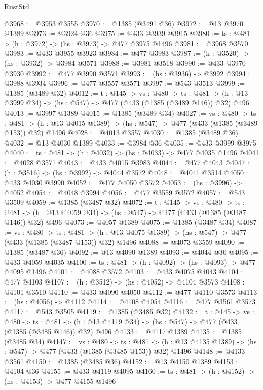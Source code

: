 \begin{lexlean}{RustStd}
\begin{coremodule}
{\begin{coremodule}
{{{{{{{@3968 := @3953 @3555
@3970 := @1385 (@3491 @36)
@3972 := @13 @3970 @1389
@3973 := @3924 @36
@3975 := @433 @3939 @3915
@3980 := {ts : @481} -> (h : @3972) -> (hs : @3973) -> @477 @3975 @1496
@3981 := @3968 @3570
@3983 := @433 @3955 @3923
@3984 := @477 @3983
@3987 := (h : @3520) -> (hs : @3932) -> @3984 @3571
@3988 := @3981 @3518
@3990 := @433 @3970 @3930
@3992 := @477 @3990 @3571
@3993 := (hs : @3936) -> @3992
@3994 := @3988 @3934
@3996 := @477 @3557 @3571
@3997 := @543 @3513
@3999 := @1385 (@3489 @32)
@4012 := {t : @145} ->
  {vs : @480} ->
  {ts : @481} -> (h : @13 @3999 @34) -> (hs : @547) -> @477 (@433 (@1385 (@3489 @146)) @32) @496
@4013 := @3997 @1389
@4015 := @1385 (@3489 @34)
@4027 := {vs : @480} ->
  {ts : @481} -> (h : @13 @4015 @1389) -> (hs : @547) -> @477 (@433 (@1385 (@3489 @153)) @32) @1496
@4028 := @4013 @3557
@4030 := @1385 (@3489 @36)
@4032 := @13 @4030 @1389
@4033 := @3984 @36
@4035 := @433 @3999 @3975
@4040 := {ts : @481} -> (h : @4032) -> (hs : @4033) -> @477 @4035 @1496
@4041 := @4028 @3571
@4043 := @433 @4015 @3983
@4044 := @477 @4043
@4047 := (h : @3516) -> (hs : @3992) -> @4044 @3572
@4048 := @4041 @3514
@4050 := @433 @4030 @3990
@4052 := @477 @4050 @3572
@4053 := (hs : @3996) -> @4052
@4054 := @4048 @3994
@4056 := @477 @3559 @3572
@4057 := @543 @3509
@4059 := @1385 (@3487 @32)
@4072 := {t : @145} ->
  {vs : @480} ->
  {ts : @481} -> (h : @13 @4059 @34) -> (hs : @547) -> @477 (@433 (@1385 (@3487 @146)) @32) @496
@4073 := @4057 @1389
@4075 := @1385 (@3487 @34)
@4087 := {vs : @480} ->
  {ts : @481} -> (h : @13 @4075 @1389) -> (hs : @547) -> @477 (@433 (@1385 (@3487 @153)) @32) @1496
@4088 := @4073 @3559
@4090 := @1385 (@3487 @36)
@4092 := @13 @4090 @1389
@4093 := @4044 @36
@4095 := @433 @4059 @4035
@4100 := {ts : @481} -> (h : @4092) -> (hs : @4093) -> @477 @4095 @1496
@4101 := @4088 @3572
@4103 := @433 @4075 @4043
@4104 := @477 @4103
@4107 := (h : @3512) -> (hs : @4052) -> @4104 @3573
@4108 := @4101 @3510
@4110 := @433 @4090 @4050
@4112 := @477 @4110 @3573
@4113 := (hs : @4056) -> @4112
@4114 := @4108 @4054
@4116 := @477 @3561 @3573
@4117 := @543 @3505
@4119 := @1385 (@3485 @32)
@4132 := {t : @145} ->
  {vs : @480} ->
  {ts : @481} -> (h : @13 @4119 @34) -> (hs : @547) -> @477 (@433 (@1385 (@3485 @146)) @32) @496
@4133 := @4117 @1389
@4135 := @1385 (@3485 @34)
@4147 := {vs : @480} ->
  {ts : @481} -> (h : @13 @4135 @1389) -> (hs : @547) -> @477 (@433 (@1385 (@3485 @153)) @32) @1496
@4148 := @4133 @3561
@4150 := @1385 (@3485 @36)
@4152 := @13 @4150 @1389
@4153 := @4104 @36
@4155 := @433 @4119 @4095
@4160 := {ts : @481} -> (h : @4152) -> (hs : @4153) -> @477 @4155 @1496
}}}}}}}
\end{coremodule}}
\end{coremodule}
\end{lexlean}

